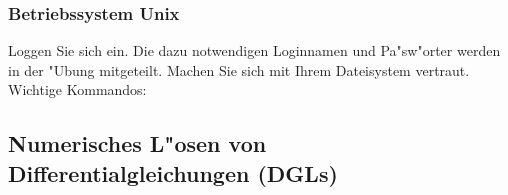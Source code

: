 \documentclass{article}
\begin{document}
\subsubsection{Betriebssystem {\sc Unix}}

Loggen Sie sich ein. Die dazu notwendigen Loginnamen und  Pa"sw"orter 
werden in der "Ubung mitgeteilt.
Machen Sie sich mit Ihrem Dateisystem vertraut. Wichtige Kommandos:




\subsection{Numerisches L"osen von Differentialgleichungen (DGLs)}
\end{document}
